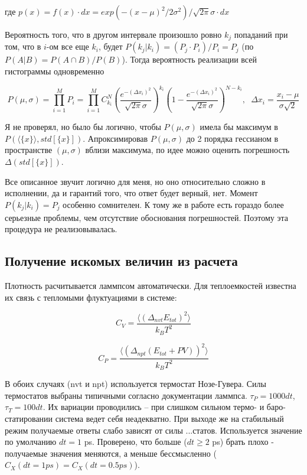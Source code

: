 \documentclass[a4paper,12pt]{article} %
\begin{document}
где $p(x) = f(x) \cdot dx = exp(-(x - \mu)^2 / 2 \sigma^2) / \sqrt{2 \pi} \sigma \cdot dx$

Вероятность того, что в другом интервале произошло ровно $k_j$ попаданий при том, что в $i$-ом все еще $k_i$, будет $P(k_j | k_i) = (P_j \cdot P_i) / P_i = P_j$ (по $P(A|B) = P(A \cap B) / P(B)$). Тогда вероятность реализации всей гистограммы одновременно

\[
P(\mu, \sigma) = \prod_{i = 1}^{M} P_i = \prod_{i = 1}^{M} C^{N}_{k_i}  \left( \dfrac{e^{- (\Delta x_i)^2}}{\sqrt{2 \pi} \sigma} \right)^{k_i}  \left( 1 - \dfrac{e^{- (\Delta x_i)^2}}{\sqrt{2 \pi} \sigma} \right) ^{N - {k_i}}, \hspace{7pt} \Delta x_i = \dfrac{x_i - \mu}{\sigma \sqrt{2}}
\]

Я не проверял, но было бы логично, чтобы $P(\mu, \sigma)$ имела бы максимум в $P(\langle \{x\} \rangle, std[\{x\}])$. Апроксимировав $P(\mu, \sigma)$ до 2 порядка гессианом в пространстве $(\mu, \sigma)$ вблизи максимума, по идее можно оценить погрешность $\Delta(std[\{x\}])$.

Все описанное звучит логично для меня, но оно относительно сложно в исполнении, да и гарантий того, что ответ будет верный, нет. Момент $P(k_j|k_i) = P_j$ особенно сомнителен. К тому же в работе есть гораздо более серьезные проблемы, чем отсутствие обоснования погрешностей. Поэтому эта процедура не реализовывалась.

\subsection{Получение искомых величин из расчета}

Плотность расчитывается ламмпсом автоматически. Для теплоемкостей известна их связь с тепломыми флуктуациями в системе:

\begin{equation}
C_V = \dfrac{\langle (\Delta_{nvt} E_{tot}) ^2 \rangle}{k_B T^2}
\end{equation}

\begin{equation}
C_P = \dfrac{\langle (\Delta_{npt} (E_{tot} + PV)) ^2 \rangle}{k_B T^2}
\end{equation}

В обоих случаях (nvt и npt) используется термостат Нозе-Гувера. Силы термостатов выбраны типичными согласно документации ламмпса. $\tau_{P} = 1000 dt$, $\tau_{T} = 100 dt$. Их вариации проводились -- при слишком сильном термо- и баро-статировании система ведет себя неадекватно. При выходе же на стабильный режим получаемые ответы слабо зависят от силы ...статов. Используется значение по умолчанию $dt = 1$ ps. Проверено, что больше ($dt \geq 2$ ps) брать плохо - получаемые значения меняются, а меньше бессмысленно ($C_X(dt = 1ps) = C_X(dt = 0.5 ps)$).
\end{document}
